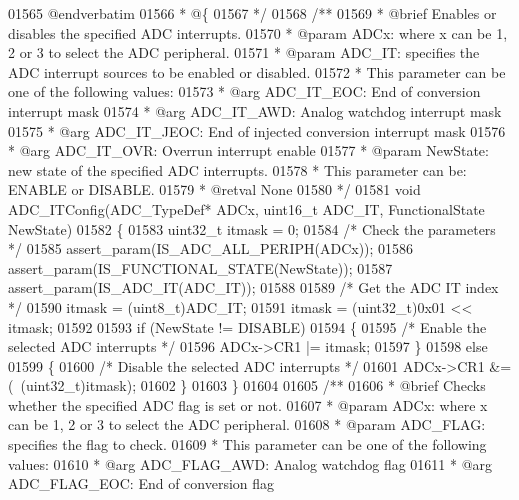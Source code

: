 \begin{DoxyCode}
01565 \textcolor{comment}{@endverbatim}
01566 \textcolor{comment}{  * @\{}
01567 \textcolor{comment}{  */}
01568 \textcolor{comment}{/**}
01569 \textcolor{comment}{  * @brief  Enables or disables the specified ADC interrupts.}
01570 \textcolor{comment}{  * @param  ADCx: where x can be 1, 2 or 3 to select the ADC peripheral.}
01571 \textcolor{comment}{  * @param  ADC\_IT: specifies the ADC interrupt sources to be enabled or disabled. }
01572 \textcolor{comment}{  *          This parameter can be one of the following values:}
01573 \textcolor{comment}{  *            @arg ADC\_IT\_EOC: End of conversion interrupt mask}
01574 \textcolor{comment}{  *            @arg ADC\_IT\_AWD: Analog watchdog interrupt mask}
01575 \textcolor{comment}{  *            @arg ADC\_IT\_JEOC: End of injected conversion interrupt mask}
01576 \textcolor{comment}{  *            @arg ADC\_IT\_OVR: Overrun interrupt enable                       }
01577 \textcolor{comment}{  * @param  NewState: new state of the specified ADC interrupts.}
01578 \textcolor{comment}{  *          This parameter can be: ENABLE or DISABLE.}
01579 \textcolor{comment}{  * @retval None}
01580 \textcolor{comment}{  */}
01581 \textcolor{keywordtype}{void} ADC_ITConfig(ADC\_TypeDef* ADCx, uint16\_t ADC\_IT, FunctionalState NewState)
01582 \{
01583   uint32\_t itmask = 0;
01584   \textcolor{comment}{/* Check the parameters */}
01585   assert_param(IS\_ADC\_ALL\_PERIPH(ADCx));
01586   assert_param(IS\_FUNCTIONAL\_STATE(NewState));
01587   assert_param(IS\_ADC\_IT(ADC\_IT));
01588 
01589   \textcolor{comment}{/* Get the ADC IT index */}
01590   itmask = (uint8\_t)ADC\_IT;
01591   itmask = (uint32\_t)0x01 << itmask;
01592 
01593   \textcolor{keywordflow}{if} (NewState != DISABLE)
01594   \{
01595     \textcolor{comment}{/* Enable the selected ADC interrupts */}
01596     ADCx->CR1 |= itmask;
01597   \}
01598   \textcolor{keywordflow}{else}
01599   \{
01600     \textcolor{comment}{/* Disable the selected ADC interrupts */}
01601     ADCx->CR1 &= (~(uint32\_t)itmask);
01602   \}
01603 \}
01604 
01605 \textcolor{comment}{/**}
01606 \textcolor{comment}{  * @brief  Checks whether the specified ADC flag is set or not.}
01607 \textcolor{comment}{  * @param  ADCx: where x can be 1, 2 or 3 to select the ADC peripheral.}
01608 \textcolor{comment}{  * @param  ADC\_FLAG: specifies the flag to check. }
01609 \textcolor{comment}{  *          This parameter can be one of the following values:}
01610 \textcolor{comment}{  *            @arg ADC\_FLAG\_AWD: Analog watchdog flag}
01611 \textcolor{comment}{  *            @arg ADC\_FLAG\_EOC: End of conversion flag}

\end{DoxyCode}
